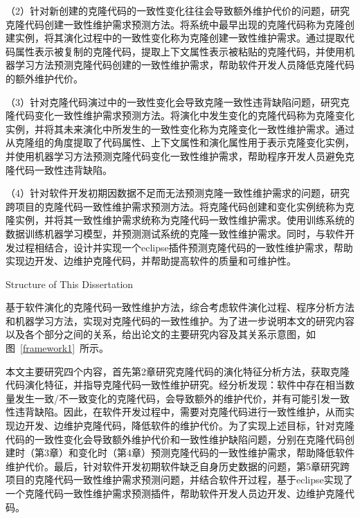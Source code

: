 （2）针对新创建的克隆代码的一致性变化往往会导致额外维护代价的问题，研究克隆代码创建一致性维护需求预测方法。将系统中最早出现的克隆代码称为克隆创建实例，将其演化过程中的一致性变化称为克隆创建一致性维护需求。通过提取代码属性表示被复制的克隆代码，提取上下文属性表示被粘贴的克隆代码，并使用机器学习方法预测克隆代码创建的一致性维护需求，帮助软件开发人员降低克隆代码的额外维护代价。

（3）针对克隆代码演过中的一致性变化会导致克隆一致性违背缺陷问题，研究克隆代码变化一致性维护需求预测方法。将演化中发生变化的克隆代码称为克隆变化实例，并将其未来演化中所发生的一致性变化称为克隆变化一致性维护需求。通过从克隆组的角度提取了代码属性、上下文属性和演化属性用于表示克隆变化实例，并使用机器学习方法预测克隆代码变化一致性维护需求，帮助程序开发人员避免克隆代码一致性违背缺陷。

（4）针对软件开发初期因数据不足而无法预测克隆一致性维护需求的问题，研究跨项目的克隆代码一致性维护需求预测方法。将克隆代码创建和变化实例统称为克隆实例，并将其一致性维护需求统称为克隆代码一致性维护需求。使用训练系统的数据训练机器学习模型，并预测测试系统的克隆一致性维护需求。同时，与软件开发过程相结合，设计并实现一个eclipse插件预测克隆代码的一致性维护需求，帮助实现边开发、边维护克隆代码，并帮助提高软件的质量和可维护性。

{Structure of This Dissertation}

基于软件演化的克隆代码一致性维护方法，综合考虑软件演化过程、程序分析方法和机器学习方法，实现对克隆代码的一致性维护。为了进一步说明本文的研究内容以及各个部分之间的关系，给出论文的主要研究内容及其关系示意图，如图~\ref{framework1}~所示。

本文主要研究四个内容，首先第2章研究克隆代码的演化特征分析方法，获取克隆代码演化特征，并指导克隆代码一致性维护研究。经分析发现：软件中存在相当数量发生一致/不一致变化的克隆代码，会导致额外的维护代价，并有可能引发一致性违背缺陷。因此，在软件开发过程中，需要对克隆代码进行一致性维护，从而实现边开发、边维护克隆代码，降低软件的维护代价。为了实现上述目标，针对克隆代码的一致性变化会导致额外维护代价和一致性维护缺陷问题，分别在克隆代码创建时（第3章）和变化时（第4章）预测克隆代码的一致性维护需求，帮助降低软件维护代价。最后，针对软件开发初期软件缺乏自身历史数据的问题，第5章研究跨项目的克隆代码一致性维护需求预测问题，并结合软件开过程，基于eclipse实现了一个克隆代码一致性维护需求预测插件，帮助软件开发人员边开发、边维护克隆代码。



